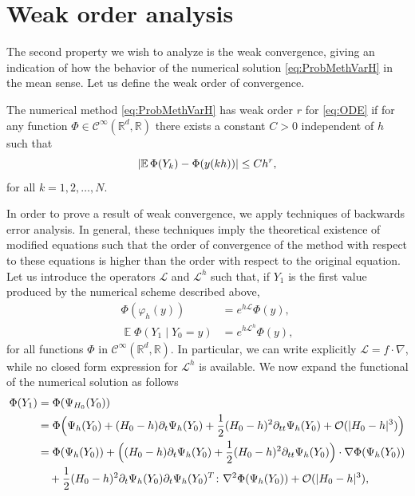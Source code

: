 \documentclass{siamart1116}
\numberwithin{theorem}{section}
\DeclarePairedDelimiter{\abs}{\lvert}{\rvert}
\renewcommand{\phi}{\varphi}
\newcommand{\R}{\mathbb{R}}
\newcommand{\OO}{\mathcal{O}}
\newcommand{\diffL}{\mathcal{L}}
\newcommand{\E}{\operatorname{\mathbb{E}}}
\begin{document}
\section{Weak order analysis}\label{sec:WeakOrder}

The second property we wish to analyze is the weak convergence, giving an indication of how the behavior of the numerical solution \eqref{eq:ProbMethVarH} in the mean sense. Let us define the weak order of convergence. 
\begin{definition} The numerical method \eqref{eq:ProbMethVarH} has weak order $r$ for \eqref{eq:ODE} if for any function $\Phi\in \mathcal C^\infty(\R^d, \R)$ there exists a constant $C > 0$ independent of $h$ such that
	\begin{equation}
	\abs{\E\Phi(Y_k) - \Phi(y(kh))} \leq Ch^r,
	\end{equation}
	for all $k = 1, 2, \ldots, N$.
\end{definition} 
In order to prove a result of weak convergence, we apply techniques of backwards error analysis. In general, these techniques imply the theoretical existence of modified equations such that the order of convergence of the method with respect to these equations is higher than the order with respect to the original equation. Let us introduce the operators $\diffL$ and $\diffL^h$ such that, if $Y_1$ is the first value produced by the numerical scheme described above, 
\begin{equation}
\begin{aligned}
	\Phi(\phi_h(y)) &= e^{h\diffL}\Phi(y),\\
	\E \Phi(Y_1\mid Y_0 = y) &= e^{h\diffL^h}\Phi(y),
\end{aligned}
\end{equation}
for all functions $\Phi$ in $\mathcal{C}^{\infty}(\R^d, \R)$. In particular, we can write explicitly $\diffL = f\cdot \nabla$, while no closed form expression for $\diffL^h$ is available. We now expand the functional of the numerical solution as follows
\begin{equation}
\begin{aligned}
	\Phi(Y_1) &= \Phi(\Psi_{H_0}(Y_0)) \\
	&= \Phi\Big(\Psi_h(Y_0) + (H_0-h)\partial_t\Psi_h(Y_0) + \frac{1}{2}(H_0-h)^2\partial_{tt}\Psi_h(Y_0) + \OO(\abs{H_0 - h}^3)\Big)\\
	&= \Phi(\Psi_h(Y_0)) + \Big((H_0 - h)\partial_t\Psi_h(Y_0)+\frac{1}{2}(H_0-h)^2\partial_{tt}\Psi_h(Y_0)\Big) \cdot \nabla\Phi(\Psi_h(Y_0))\\
	&\quad + \frac{1}{2}(H_0 - h)^2 \partial_t \Psi_h(Y_0) \partial_t \Psi_h(Y_0)^T \colon \nabla^2\Phi(\Psi_h(Y_0)) + \OO(\abs{H_0 - h}^3),
\end{aligned}
\end{equation}
\end{document}

